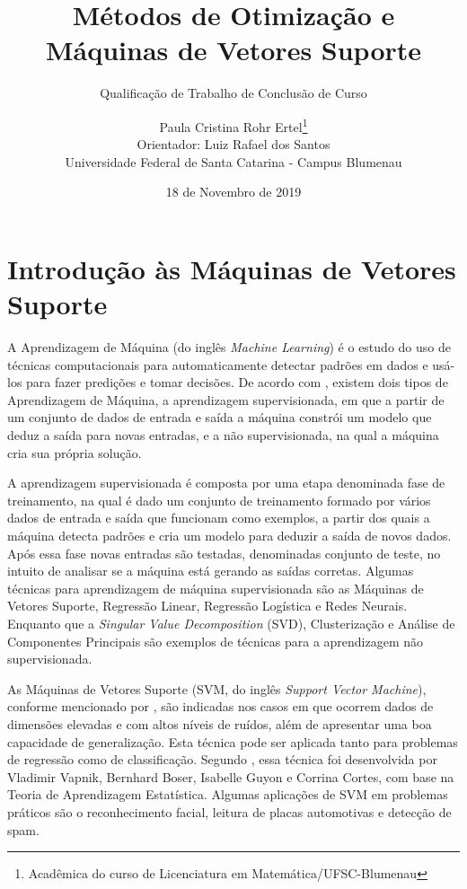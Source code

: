 \documentclass[12pt,a4paper]{scrartcl}
\theoremstyle{definition}%
\begin{document}
\title{Métodos de Otimização e Máquinas de Vetores Suporte} 
\author{ \normalfont Paula Cristina Rohr Ertel\thanks{Acadêmica do curso de Licenciatura em Matemática/UFSC-Blumenau} \\ \small Orientador: Luiz Rafael dos Santos \\ \small Universidade Federal de Santa Catarina - Campus Blumenau}
\date{\small 18 de Novembro de 2019}
\subtitle{Qualificação de Trabalho de Conclusão de Curso}
\maketitle

\section{Introdução às Máquinas de Vetores Suporte}

A Aprendizagem de Máquina (do inglês \textit{Machine Learning}) é o estudo do uso de técnicas computacionais para automaticamente detectar padrões em dados e usá-los para fazer predições e tomar decisões. De acordo com \textcite{Evelin2017}, existem dois tipos de Aprendizagem de Máquina, a aprendizagem supervisionada, em que a partir de um conjunto de dados de entrada e saída a máquina constrói um modelo que deduz a saída para novas entradas, e a não supervisionada, na qual a máquina cria sua própria solução. 

A aprendizagem supervisionada é composta por uma etapa denominada fase de treinamento, na qual é dado um conjunto de treinamento formado por vários dados de entrada e saída que funcionam como exemplos, a partir dos quais a máquina detecta padrões e cria um modelo para deduzir a saída de novos dados. Após essa fase novas entradas são testadas, denominadas conjunto de teste, no intuito de analisar se a máquina está gerando as saídas corretas. Algumas técnicas para aprendizagem de máquina supervisionada são as Máquinas de Vetores Suporte, Regressão Linear, Regressão Logística e Redes Neurais. Enquanto que a \textit{Singular Value Decomposition} (SVD), Clusterização e Análise de Componentes Principais \cite{Evelin2017} são exemplos de técnicas para a aprendizagem não supervisionada. 

As Máquinas de Vetores Suporte (SVM, do inglês \textit{Support Vector Machine}), conforme mencionado por \textcite{Evelin2017}, são indicadas nos casos em que ocorrem dados de dimensões elevadas e com altos níveis de ruídos, além de apresentar uma boa capacidade de generalização. Esta técnica pode ser aplicada tanto para problemas de regressão como de classificação. Segundo \textcite{Evelin2017}, essa técnica foi desenvolvida por Vladimir Vapnik, Bernhard Boser, Isabelle Guyon e Corrina Cortes, com base na Teoria de Aprendizagem Estatística. Algumas aplicações de SVM em problemas práticos são o reconhecimento facial, leitura de placas automotivas e detecção de spam.
\end{document}
